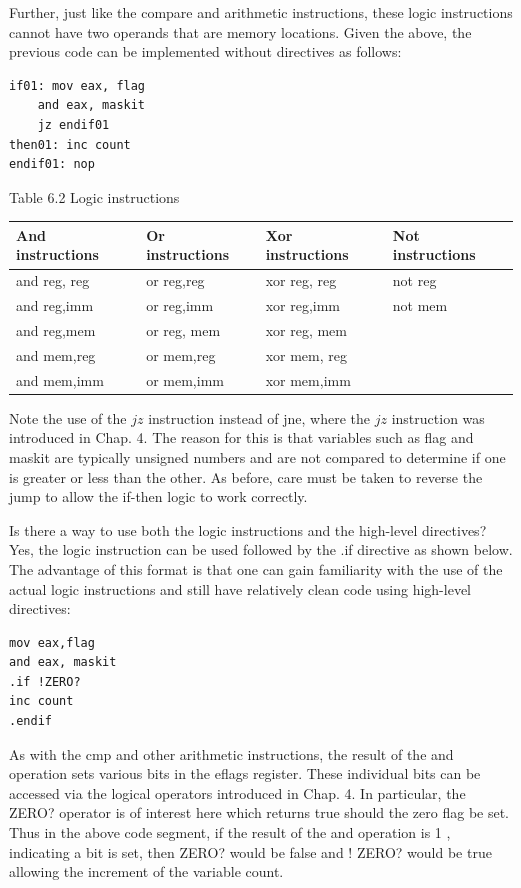 \documentclass[10pt]{article}
\begin{document}
Further, just like the compare and arithmetic instructions, these logic instructions cannot have two operands that are memory locations. Given the above, the previous code can be implemented without directives as follows:

\begin{verbatim}
if01: mov eax, flag
    and eax, maskit
    jz endif01
then01: inc count
endif01: nop
\end{verbatim}

Table 6.2 Logic instructions

\begin{center}
\begin{tabular}{|llll|}
\hline
And instructions & Or instructions & Xor instructions & Not instructions \\
\hline
and reg, reg & or reg,reg & xor reg, reg & not reg \\
and reg,imm & or reg,imm & xor reg,imm & not mem \\
and reg,mem & or reg, mem & xor reg, mem &  \\
and mem,reg & or mem,reg & xor mem, reg &  \\
and mem,imm & or mem,imm & xor mem,imm &  \\
\hline
\end{tabular}
\end{center}

Note the use of the $j z$ instruction instead of jne, where the $j z$ instruction was introduced in Chap. 4. The reason for this is that variables such as flag and maskit are typically unsigned numbers and are not compared to determine if one is greater or less than the other. As before, care must be taken to reverse the jump to allow the if-then logic to work correctly.

Is there a way to use both the logic instructions and the high-level directives? Yes, the logic instruction can be used followed by the .if directive as shown below. The advantage of this format is that one can gain familiarity with the use of the actual logic instructions and still have relatively clean code using high-level directives:

\begin{verbatim}
mov eax,flag
and eax, maskit
.if !ZERO?
inc count
.endif
\end{verbatim}

As with the cmp and other arithmetic instructions, the result of the and operation sets various bits in the eflags register. These individual bits can be accessed via the logical operators introduced in Chap. 4. In particular, the ZERO? operator is of interest here which returns true should the zero flag be set. Thus in the above code segment, if the result of the and operation is 1 , indicating a bit is set, then ZERO? would be false and ! ZERO? would be true allowing the increment of the variable count.
\end{document}
